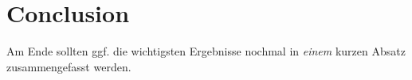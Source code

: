 \section{Conclusion}
\label{ch:Evaluation:sec:Conclusion}

Am Ende sollten ggf. die wichtigsten Ergebnisse nochmal in \emph{einem} kurzen Absatz zusammengefasst werden.

